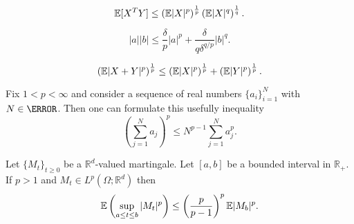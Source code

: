 \begin{Holder}
	\begin{equation}\label{eqn:HolderInequality}
	\mathbb{E}[X^T Y] \leq
	\left(
	\mathbb{E}|X|^p
	\right)^{\frac{1}{p}}		
	\left(
	\mathbb{E}|X|^q
	\right)^{\frac{1}{q}}.
	\end{equation}
\end{Holder}

\begin{Young}
	\begin{equation}\label{eqn:YoungsInequality}
	|a||b| 
	\leq
	\frac{\delta}{p} |a|^p
	+\frac{\delta}{q \delta^{q/p}} |b|^q.
	\end{equation}
\end{Young}
%
\begin{Minkowski}
	\begin{equation}
	\left(
	\mathbb{E}|X+Y|^p
	\right)^{\frac{1}{p}}
	\leq
	\left(
	\mathbb{E}|X|^p
	\right)^{\frac{1}{p}}
	+
	\left(
	\mathbb{E}|Y|^p
	\right)^{\frac{1}{p}}.
	\end{equation}
\end{Minkowski}
%
%
\begin{Standard}
		Fix $1<p<\infty$ and consider a sequence of real numbers $\{a_i\}_{i=1}^{N}$  with $N \in \N$. Then one can 
	formulate this usefully inequality
	\begin{equation}\label{eqn:SingleHolder}
	\left(
	\sum_{j=1}^N a_j
	\right)^p
	\leq
	N^{p-1}
	\sum_{j=1}^{N}
	a_j^p.
	\end{equation}
\end{Standard}
%
\begin{Doobs}
	Let $\{M_t\}_{t\geq 0}$ be a $\mathbb{R}^d$-valued martingale. Let $[a,b]$ be a bounded interval in $
	\mathbb{R}_{+}$.
	If $p>1$ and $M_t\in L^p(\Omega;\mathbb{R}^d)$ then
	\begin{equation}
	\label{eqn:DoobMartingaleInequality}
	\mathbb{E}\left( \sup_{a\leq t \leq b} |M_t|^p\right) 
	\leq \left(\frac{p}{p-1}\right)^p \mathbb{E}|M_b|^p. 
	\end{equation}
\end{Doobs}

